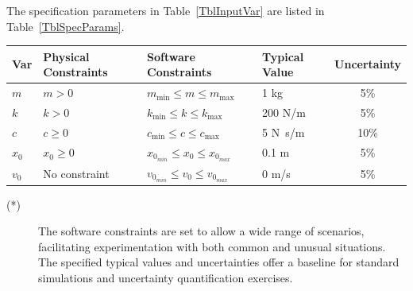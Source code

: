 \documentclass[12pt]{article}
\begin{document}
The specification parameters in Table~\ref{TblInputVar} are listed in
Table~\ref{TblSpecParams}.

\begin{table}[!h]
  \caption{Input Variables} \label{TblInputVar}
  \renewcommand{\arraystretch}{1.2}
\noindent \begin{longtable*}{l l l l c} 
  \toprule
  \textbf{Var} & \textbf{Physical Constraints} & \textbf{Software Constraints} &
                             \textbf{Typical Value} & \textbf{Uncertainty}\\
  \midrule 
  $m$ & $m > 0$ & $m_{\text{min}} \leq m \leq m_{\text{max}}$ & 1
  \si[per-mode=symbol] {\kilogram} & 5\%\\

  $k$ & $k > 0$ & $k_{\text{min}} \leq k \leq k_{\text{max}}$ & 200 
  \si[per-mode=symbol] {\newton\per\meter} & 5\%\\

  $c$ & $c \geq 0$ & $c_{\text{min}} \leq c \leq c_{\text{max}}$ & 5 
  \si[per-mode=symbol] {\newton\second\per\meter} & 10\%\\

  $x_{0}$ & $x_{0} \geq 0$ & $x_{0_{min}} \leq x_{0} \leq 
  x_{0_{max}}$ & 0.1 \si[per-mode=symbol] {\meter} & 5\%\\

  $v_{0}$ & No constraint & $v_{0_{min}} \leq v_{0} \leq 
  v_{0_{max}}$ & 0 \si[per-mode=symbol] {\meter\per\second} & 5\%\\
  \bottomrule
\end{longtable*}
\end{table}

\noindent 
\begin{description}
\item[(*)] The software constraints are set to allow a wide range of scenarios, 
facilitating experimentation with both common and unusual situations. 
The specified typical values and uncertainties offer a baseline for standard 
simulations and uncertainty quantification exercises.
\end{description}
\end{document}
